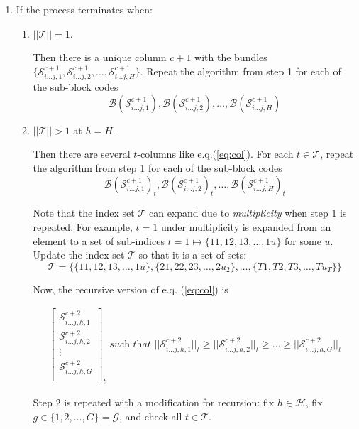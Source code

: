 \documentclass[12pt]{article}  %
\begin{document}
\begin{enumerate}
\begin{enumerate}
\item If the process terminates when:

\begin{enumerate}
\item $||\mathcal{T}||=1$.

Then there is a unique column $c+1$ with the bundles 
$\{
\mathcal{S}^{c+1}_{i \dots j,1},
\mathcal{S}^{c+1}_{i \dots j,2},
\dots,
\mathcal{S}^{c+1}_{i \dots j,H}
\}$. Repeat the algorithm from step 1 for each of the sub-block codes 
$$
\mathcal{B}(\mathcal{S}^{c+1}_{i \dots j,1}),
\mathcal{B}(\mathcal{S}^{c+1}_{i \dots j,2}),
\dots,
\mathcal{B}(\mathcal{S}^{c+1}_{i \dots j,H})
$$

\item $||\mathcal{T}||>1$ at $h=H$.

Then there are several $t$-columns like e.q.(\ref{eq:col}). For each $t \in \mathcal{T}$, repeat the algorithm from step 1 for each of the sub-block codes
$$
\mathcal{B}(\mathcal{S}^{c+1}_{i \dots j,1})_t,
\mathcal{B}(\mathcal{S}^{c+1}_{i \dots j,2})_t,
\dots,
\mathcal{B}(\mathcal{S}^{c+1}_{i \dots j,H})_t
$$



Note that the index set $\mathcal{T}$ can expand due to \emph{multiplicity} when step 1 is repeated. For example, $t=1$ under multiplicity is expanded from an element to a set of sub-indices $t=1 \mapsto \{11,12,13,\dots,1u\}$ for some $u$. Update the index set $\mathcal{T}$ so that it is a set of sets: 
$$\mathcal{T} = \{ 
\{11,12,13,\dots,1u\},
\{21,22,23,\dots,2u_2\},
\dots,
\{T1,T2,T3,\dots,Tu_T\}
 \}$$

Now, the recursive version of e.q. (\ref{eq:col}) is

\begin{align}\label{eq:col2}
\left[\begin{array}{c}
\mathcal{S}^{c+2}_{i \dots j,h,1}\\
\mathcal{S}^{c+2}_{i \dots j,h,2}\\
\vdots \\
\mathcal{S}^{c+2}_{i \dots j,h,G}\\
\end{array}\right]_t
\textit{ such that \ }
||\mathcal{S}^{c+2}_{i \dots j,h,1}||_t \geq
||\mathcal{S}^{c+2}_{i \dots j,h,2}||_t \geq
\dots \geq
||\mathcal{S}^{c+2}_{i \dots j,h,G}||_t
\end{align}


Step 2 is repeated with a modification for recursion: fix $h \in \mathcal{H}$, fix $g \in \{1,2,\dots,G\}=\mathcal{G}$, and check all $t \in \mathcal{T}$.



\end{enumerate}
\end{enumerate}
\end{enumerate}
\end{document}
